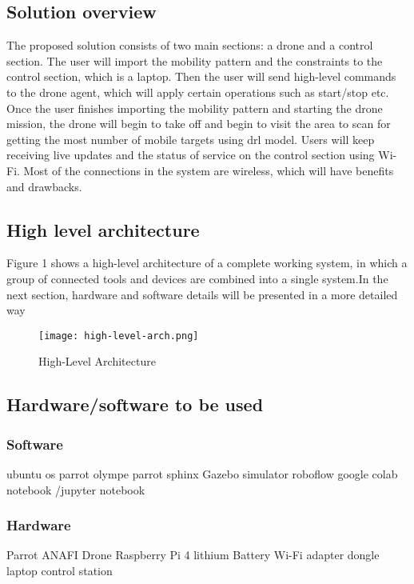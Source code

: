\documentclass[../main.tex]{subfiles}
\begin{document}
\subsection{Solution overview}

The proposed solution consists of two main sections: a drone and a control section. The user will import
the mobility pattern and the constraints to the control section, which is a laptop. Then the user will send high-level commands to the drone agent, which will apply certain operations such as start/stop etc. Once the user finishes importing the mobility pattern and starting the drone mission, the drone will begin to take off and begin to visit the area to scan for getting the most number of mobile targets using \gls{drl} model. Users will keep receiving live updates and the status of service on the control section using Wi-Fi. Most of the connections in the system are wireless, which will have benefits and drawbacks.


\subsection{High level architecture}
Figure 1 shows a high-level architecture of a complete working system, in which a group of connected tools and devices are combined into a single system.In the next section, hardware and software details will be presented in a more detailed way
\begin{figure}[H]
	\centering
	\texttt{[image: high-level-arch.png]}
	\caption{High-Level Architecture}\label{fig1:arch-fig}
\end{figure}


\subsection{Hardware/software to be used}

\subsubsection{Software}
ubuntu os
parrot olympe
parrot sphinx
Gazebo simulator
roboflow
google colab notebook /jupyter notebook


\subsubsection{Hardware}
Parrot ANAFI Drone
Raspberry Pi 4
lithium Battery
Wi-Fi adapter dongle
laptop control station
\end{document}
